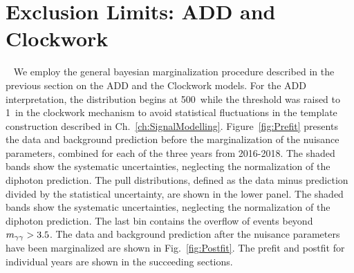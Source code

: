 \section{Exclusion Limits: ADD and Clockwork}~\label{sec:ADDCWresults}
We employ the general bayesian marginalization procedure described in the previous section on the ADD and the Clockwork models. For the ADD interpretation, the \mgg distribution begins at 500~\GeV while the threshold was raised to 1~\TeV in the clockwork mechanism to avoid statistical fluctuations in the template construction described in Ch.~\ref{ch:SignalModelling}. Figure~\ref{fig:Prefit} presents the data and background prediction before the marginalization of the nuisance parameters, combined for each of the three years from 2016-2018. 
The shaded bands show the systematic uncertainties, neglecting the normalization of the diphoton prediction. The pull distributions, defined as the data minus prediction divided by the statistical uncertainty, are shown in the lower panel.
The shaded bands show the systematic uncertainties, neglecting the normalization of the diphoton prediction.
The last bin contains the overflow of events beyond $m_{\gamma\gamma}>3.5$\TeV.
The data and background prediction after the nuisance parameters have been marginalized are shown in Fig.~\ref{fig:Postfit}. The prefit and postfit for individual years are shown in the succeeding sections.

